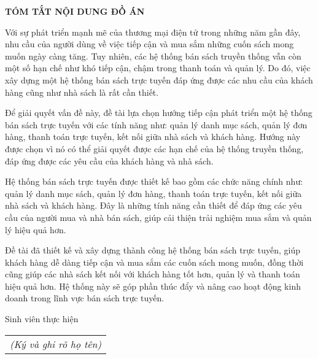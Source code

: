 \documentclass[../DoAn.tex]{subfiles}
\begin{document}
\begin{center}
    \Large{\textbf{TÓM TẮT NỘI DUNG ĐỒ ÁN}}\\
\end{center}
\vspace{1cm}
Với sự phát triển mạnh mẽ của thương mại điện tử trong những năm gần đây, nhu cầu của người dùng về việc tiếp cận và mua sắm những cuốn sách mong muốn ngày càng tăng. Tuy nhiên, các hệ thống bán sách truyền thống vẫn còn một số hạn chế như khó tiếp cận, chậm trong thanh toán và quản lý. Do đó, việc xây dựng một hệ thống bán sách trực tuyến đáp ứng được các nhu cầu của khách hàng cũng như nhà sách là rất cần thiết.

Để giải quyết vấn đề này, đề tài lựa chọn hướng tiếp cận phát triển một hệ thống bán sách trực tuyến với các tính năng như: quản lý danh mục sách, quản lý đơn hàng, thanh toán trực tuyến, kết nối giữa nhà sách và khách hàng. Hướng này được chọn vì nó có thể giải quyết được các hạn chế của hệ thống truyền thống, đáp ứng được các yêu cầu của khách hàng và nhà sách.

Hệ thống bán sách trực tuyến được thiết kế bao gồm các chức năng chính như: quản lý danh mục sách, quản lý đơn hàng, thanh toán trực tuyến, kết nối giữa nhà sách và khách hàng. Đây là những tính năng cần thiết để đáp ứng các yêu cầu của người mua và nhà bán sách, giúp cải thiện trải nghiệm mua sắm và quản lý hiệu quả hơn.

Đề tài đã thiết kế và xây dựng thành công hệ thống bán sách trực tuyến, giúp khách hàng dễ dàng tiếp cận và mua sắm các cuốn sách mong muốn, đồng thời cũng giúp các nhà sách kết nối với khách hàng tốt hơn, quản lý và thanh toán hiệu quả hơn. Hệ thống này sẽ góp phần thúc đẩy và nâng cao hoạt động kinh doanh trong lĩnh vực bán sách trực tuyến.
\begin{flushright}
Sinh viên thực hiện\\
\begin{tabular}{@{}c@{}}
\textit{(Ký và ghi rõ họ tên)}
\end{tabular}
\end{flushright}
\end{document}
